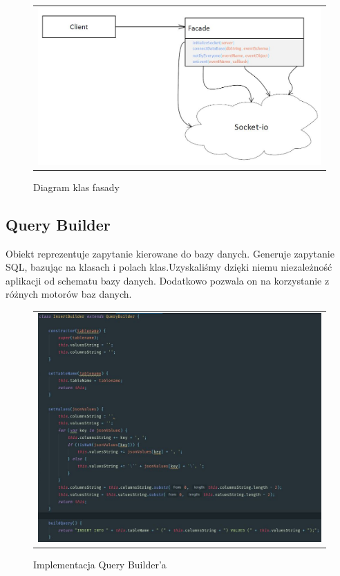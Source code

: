 \documentclass{sprawozdanie-agh}
\begin{document}
	\begin{figure}[H] 
		\centering
		\begin{tabular}{c}
			\includegraphics[width=.75\textwidth]{Fasadaclass}
		\end{tabular} 
		\caption{Diagram klas fasady}
	\end{figure}
	
	\subsection{Query Builder}
	
	Obiekt reprezentuje zapytanie kierowane do bazy
	danych. Generuje zapytanie SQL, bazując na klasach i polach
	klas.Uzyskaliśmy dzięki niemu niezależność aplikacji od schematu
	bazy danych. Dodatkowo pozwala on na korzystanie z różnych motorów baz danych.
	
	\begin{figure}[H] 
		\centering
		\begin{tabular}{c}
			\includegraphics[width=.99\textwidth]{insertbuilder}
		\end{tabular} 
		\caption{Implementacja Query Builder'a}
	\end{figure}
\end{document}
